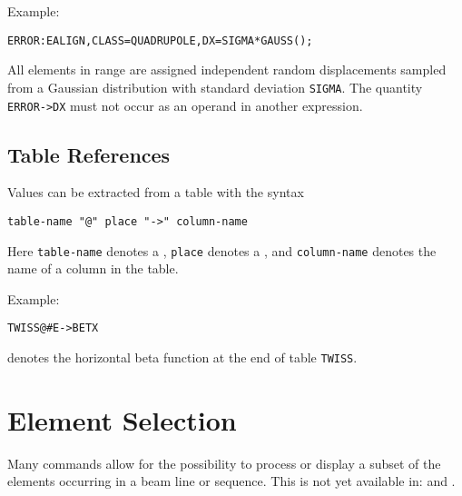 \noindent Example:
\begin{verbatim}
ERROR:EALIGN,CLASS=QUADRUPOLE,DX=SIGMA*GAUSS();
\end{verbatim}
All elements in range are assigned independent random
displacements sampled from a Gaussian distribution
with standard deviation \texttt{SIGMA}.
The quantity \texttt{ERROR->DX} must not occur as an operand
in another expression.

\subsection{Table References}
\label{sec:acell}
Values can be extracted from a table with the syntax
\begin{verbatim}
table-name "@" place "->" column-name
\end{verbatim}
Here \texttt{table-name} denotes a ,
\texttt{place} denotes a ,
and \texttt{column-name} denotes the name of a column in the table.

\noindent Example:
\begin{verbatim}
TWISS@#E->BETX
\end{verbatim}
denotes the horizontal beta function at the end of table
\texttt{TWISS}. 

\section{Element Selection}
Many \opal commands allow for the possibility to process or display
a subset of the elements occurring in a beam line or sequence. This is not yet available in: 
\noopalt and \noopalcycl.

